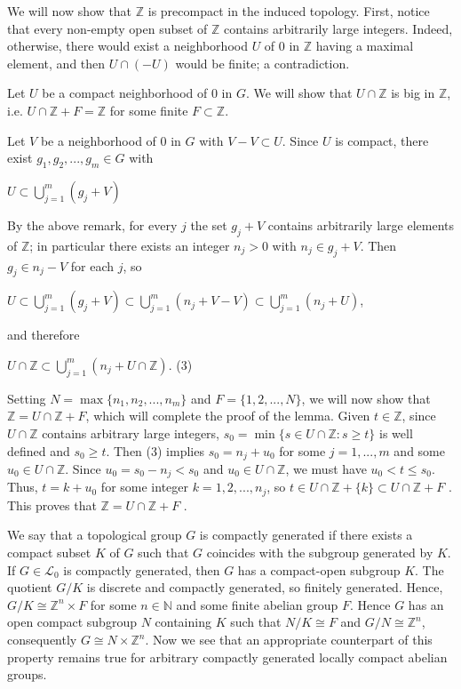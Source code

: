 \documentclass[12pt]{article}
\begin{document}
    We will now show that $\mathbb{Z}$ is precompact in the induced topology. First, notice that every non-empty open subset of $\mathbb{Z}$
contains arbitrarily large integers. Indeed, otherwise, there would exist a neighborhood $U$ of 0 in $\mathbb{Z}$ having a maximal
element, and then $U \cap (-U)$ would be finite; a contradiction.
    

    Let $U$ be a compact neighborhood of 0 in $G$. We will show that $U \cap \mathbb{Z}$ is big in $\mathbb{Z}$, i.e. $U \cap \mathbb{Z} + F = \mathbb{Z}$ for some finite
$F \subset \mathbb{Z}$.


    Let $V$ be a neighborhood of 0 in $G$ with $V - V \subset U$. Since $U$ is compact, there exist $g_1, g_2,..., g_m \in G$ with


    $U \subset \bigcup^m_{j=1} (g_j + V)$


By the above remark, for every $j$ the set $g_j + V$ contains arbitrarily large elements of $\mathbb{Z}$; in particular there exists an integer
$n_j > 0$ with $n_j \in g_j + V$. Then $g_j \in n_j - V$ for each $j$, so


    $U \subset \bigcup^m_{j=1}(g_j + V ) \subset \bigcup^m_{j=1} (n_j + V - V ) \subset \bigcup^m_{j=1}(n_j + U)$,


and therefore


    $U \cap \mathbb{Z} \subset \bigcup^m_{j=1}(n_j + U \cap \mathbb{Z}). $    (3)


Setting $N = \max \{n_1,n_2,...,n_m\}$ and $F = \{1, 2,..., N\}$, we will now show that $\mathbb{Z} = U \cap \mathbb{Z} + F$, which will complete the proof
of the lemma. Given $t \in \mathbb{Z}$, since $U \cap \mathbb{Z}$ contains arbitrary large integers, $s_0 = \min \{s \in U \cap \mathbb{Z}: s \geqslant t \}$ is well defined and
$s_0 \geqslant t$. Then (3) implies $s_0 = n_j + u_0$ for some $j = 1,...,m$ and some $u_0 \in U \cap \mathbb{Z}$. Since $u_0 = s_0 - n_j < s_0$ and $u_0 \in U \cap \mathbb{Z}$,
we must have $u_0 < t \leqslant s_0$. Thus, $t = k + u_0$ for some integer $k = 1, 2,...,n_j$, so $t \in U \cap \mathbb{Z} + \{k\} \subset U \cap \mathbb{Z} + F$ . This proves that
$\mathbb{Z} = U \cap \mathbb{Z} + F$ . 


    We say that a topological group $G$ is compactly generated if there exists a compact subset $K$ of $G$ such that $G$ coincides
with the subgroup generated by $K$. If $G \in \mathcal{L}_0$ is compactly generated, then $G$ has a compact-open subgroup $K$. The quotient
$G/K$ is discrete and compactly generated, so finitely generated. Hence, $G/K \cong \mathbb{Z}^n \times F$ for some $n \in \mathbb{N}$ and some finite
abelian group $F$. Hence $G$ has an open compact subgroup $N$ containing $K$ such that $N/K \cong F$ and $G/N \cong \mathbb{Z}^n$, consequently
$G \cong N \times \mathbb{Z}^n$. Now we see that an appropriate counterpart of this property remains true for arbitrary compactly generated
locally compact abelian groups.
\end{document}
